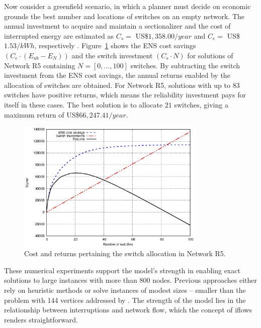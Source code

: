 Now consider a greenfield scenario, in which a planner must decide on economic grounds the best number and locations of switches on an empty network. The annual investment to acquire and maintain a sectionalizer and the cost of interrupted energy are estimated as $C_s =$ US\$$1,358.00/year$ and $C_e =$ US\$$1.53/kWh$, respectively \cite{brown2008}. Figure~\ref{fig:R5example} shows the ENS cost savings $(C_e \cdot (E_{ub} - E_N))$ and the switch investment $(C_s \cdot N)$ for solutions of Network R5 containing $N = [0,\ldots,100]$ switches. By subtracting the switch investment from the ENS cost savings, the annual returns enabled by the allocation of switches are obtained. For Network R5, solutions with up to $83$ switches have positive returns, which means the reliability investment pays for itself in these cases. The best solution is to allocate $21$ switches, giving a maximum return of US\$$66,247.41/year$.

\begin{figure}[hbtp]
	\begin{center}
	      \includegraphics[width=0.8\textwidth]{dadosEND2}
	\end{center}
\caption{Cost and returns pertaining the switch allocation in Network R5.}
\label{fig:R5example}
\end{figure}

These numerical experiments support the model's strength in enabling exact solutions to large instances with more than 800 nodes. Previous approaches either rely on heuristic methods or solve instances of modest sizes -- smaller than the problem with 144 vertices addressed  by \cite{FarajollahiFotuhiSafdarian2019}. The strength of the model lies in the relationship between interruptions and network flow, which the concept of iflows renders straightforward.



